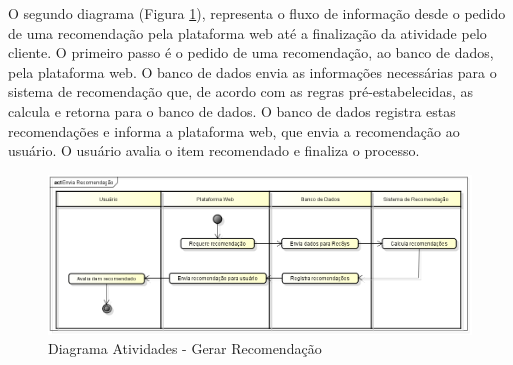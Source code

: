 O segundo diagrama (Figura \ref{fig:Diagrama de Atividades - Recomendacao}), representa o fluxo de informação desde o pedido de uma recomendação pela plataforma web até a finalização da atividade pelo cliente. O primeiro passo é o pedido de uma recomendação, ao banco de dados, pela plataforma web. O banco de dados envia as informações necessárias para o sistema de recomendação que, de acordo com as regras pré-estabelecidas, as calcula e retorna para o banco de dados. O banco de dados registra estas recomendações e informa a plataforma web, que envia a recomendação ao usuário. O usuário avalia o item recomendado e finaliza o processo. 


 \begin{figure}[htp]
    \begin{center}
    \includegraphics[width=1\textwidth]{img/Atividade_Recomendacao}
    \end{center}
    \caption{Diagrama Atividades - Gerar Recomendação}
    \label{fig:Diagrama de Atividades - Recomendacao}
\end{figure}